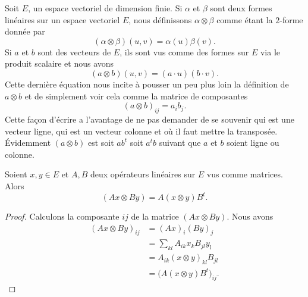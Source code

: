 Soit \( E\), un espace vectoriel de dimension finie. Si \( \alpha\) et \( \beta\) sont deux formes linéaires sur un espace vectoriel \( E\), nous définissons \( \alpha\otimes \beta\) comme étant la \( 2\)-forme donnée par
\begin{equation}
    (\alpha\otimes \beta)(u,v)=\alpha(u)\beta(v).
\end{equation}
Si \( a\) et \( b\) sont des vecteurs de \( E\), ils sont vus comme des formes sur \( E\) via le produit scalaire et nous avons
\begin{equation}
    (a\otimes b)(u,v)=(a\cdot u)(b\cdot v).
\end{equation}
Cette dernière équation nous incite à pousser un peu plus loin la définition de \( a\otimes b\) et de simplement voir cela comme la matrice de composantes
\begin{equation}
    (a\otimes b)_{ij}=a_ib_j.
\end{equation}
Cette façon d'écrire a l'avantage de ne pas demander de se souvenir qui est une vecteur ligne, qui est un vecteur colonne et où il faut mettre la transposée. Évidemment \( (a\otimes b)\) est soit \( ab^t\) soit \( a^tb\) suivant que \( a\) et \( b\) soient ligne ou colonne.

\begin{lemma}   \label{LemMyKPzY}
    Soient \( x,y\in E\) et \( A,B\) deux opérateurs linéaires sur \( E\) vus comme matrices. Alors
    \begin{equation}        \label{EqXdxvSu}
        (Ax\otimes By)=A(x\otimes y)B^t.
    \end{equation}
\end{lemma}

\begin{proof}
    Calculons la composante \( ij\) de la matrice \( (Ax\otimes By)\). Nous avons
    \begin{subequations}
        \begin{align}
            (Ax\otimes By)_{ij}&=(Ax)_i(By)_j\\
            &=\sum_{kl}A_{ik}x_kB_{jl}y_l\\
            &=A_{ik}(x\otimes y)_{kl}B_{jl}\\
            &=\big( A(x\otimes y)B^t \big)_{ij}.
        \end{align}
    \end{subequations}
\end{proof}

